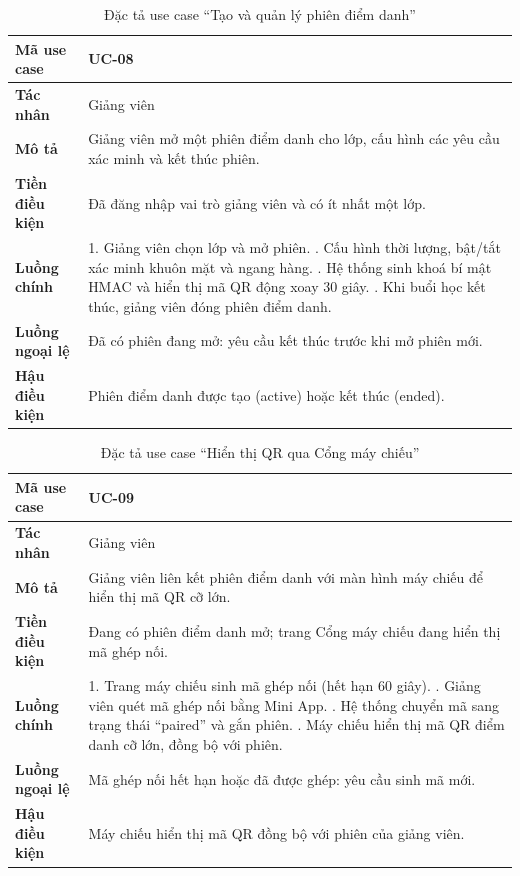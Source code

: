 \begin{table}[H]
\centering
\small
\caption{Đặc tả use case ``Tạo và quản lý phiên điểm danh''}
\label{tab:uc-session}
\begin{tabular}{|p{3cm}|p{10.6cm}|}
\hline
\textbf{Mã use case} & UC-08 \\ \hline
\textbf{Tác nhân} & Giảng viên \\ \hline
\textbf{Mô tả} & Giảng viên mở một phiên điểm danh cho lớp, cấu hình các yêu cầu xác minh và kết thúc phiên. \\ \hline
\textbf{Tiền điều kiện} & Đã đăng nhập vai trò giảng viên và có ít nhất một lớp. \\ \hline
\textbf{Luồng chính} & 1. Giảng viên chọn lớp và mở phiên. \newline 2. Cấu hình thời lượng, bật/tắt xác minh khuôn mặt và ngang hàng. \newline 3. Hệ thống sinh khoá bí mật HMAC và hiển thị mã QR động xoay 30 giây. \newline 4. Khi buổi học kết thúc, giảng viên đóng phiên điểm danh. \\ \hline
\textbf{Luồng ngoại lệ} & Đã có phiên đang mở: yêu cầu kết thúc trước khi mở phiên mới. \\ \hline
\textbf{Hậu điều kiện} & Phiên điểm danh được tạo (active) hoặc kết thúc (ended). \\ \hline
\end{tabular}
\end{table}

\begin{table}[H]
\centering
\small
\caption{Đặc tả use case ``Hiển thị QR qua Cổng máy chiếu''}
\label{tab:uc-projector}
\begin{tabular}{|p{3cm}|p{10.6cm}|}
\hline
\textbf{Mã use case} & UC-09 \\ \hline
\textbf{Tác nhân} & Giảng viên \\ \hline
\textbf{Mô tả} & Giảng viên liên kết phiên điểm danh với màn hình máy chiếu để hiển thị mã QR cỡ lớn. \\ \hline
\textbf{Tiền điều kiện} & Đang có phiên điểm danh mở; trang Cổng máy chiếu đang hiển thị mã ghép nối. \\ \hline
\textbf{Luồng chính} & 1. Trang máy chiếu sinh mã ghép nối (hết hạn 60 giây). \newline 2. Giảng viên quét mã ghép nối bằng Mini App. \newline 3. Hệ thống chuyển mã sang trạng thái ``paired'' và gắn phiên. \newline 4. Máy chiếu hiển thị mã QR điểm danh cỡ lớn, đồng bộ với phiên. \\ \hline
\textbf{Luồng ngoại lệ} & Mã ghép nối hết hạn hoặc đã được ghép: yêu cầu sinh mã mới. \\ \hline
\textbf{Hậu điều kiện} & Máy chiếu hiển thị mã QR đồng bộ với phiên của giảng viên. \\ \hline
\end{tabular}
\end{table}

